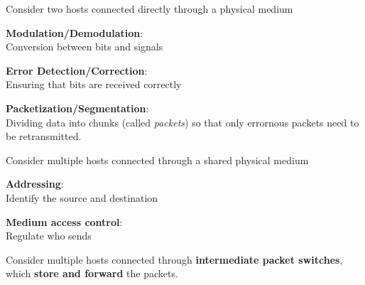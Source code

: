 \documentclass[20pt,handout,notes=show]{beamer}
\begin{document}
\begin{frame}[t]\normalsize
	Consider two hosts connected directly through a physical medium
\end{frame}

\begin{frame} \begin{center} \large
	\textbf{Modulation/Demodulation}:\\ Conversion between bits and signals\\
\end{center} \end{frame}

\begin{frame} \begin{center} \large
	\textbf{Error Detection/Correction}:\\ Ensuring that bits are received correctly\\
\end{center} \end{frame}

\begin{frame}\begin{center}\large
	\textbf{Packetization/Segmentation}:\\ \large Dividing data into chunks (called \textit{packets}) 
	so that only errornous packets need to be retransmitted.
\end{center}\end{frame}

\begin{frame}[t]\normalsize
	Consider multiple hosts connected through a shared physical medium
\end{frame}

\begin{frame}\begin{center}\large
	\textbf{Addressing}:\\ Identify the source and destination
\end{center}\end{frame}

\begin{frame}\begin{center}\large
	\textbf{Medium access control}:\\ Regulate who sends
\end{center}\end{frame}

\begin{frame}[t]\normalsize
	Consider multiple hosts connected through \textbf{intermediate packet switches}, 
	which \textbf{store and forward} the packets.
\end{frame}
\end{document}
